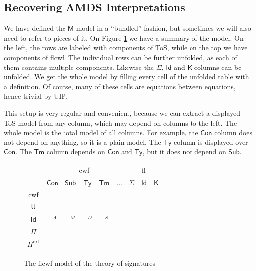 \documentclass[12pt,a4paper,twoside,openany]{book}
\theoremstyle{remark}
\theoremstyle{definition}
\theoremstyle{theorem}
\newcommand{\bs}[1]{\boldsymbol{#1}}
\newcommand{\Con}{\mathsf{Con}}
\newcommand{\Sub}{\mathsf{Sub}}
\newcommand{\Tm}{\mathsf{Tm}}
\newcommand{\Ty}{\mathsf{Ty}}
\newcommand{\U}{\mathsf{U}}
\newcommand{\Id}{\mathsf{Id}}
\newcommand{\blank}{\mathord{\hspace{1pt}\text{--}\hspace{1pt}}}
\newcommand{\Pie}{\Pi^{\mathsf{ext}}}
\newcommand{\K}{\mathsf{K}}
\newcommand{\bM}{\bs{\mathsf{M}}}
\begin{document}
\subsection{Recovering AMDS Interpretations}

We have defined the $\bM$ model in a ``bundled'' fashion, but sometimes we will
also need to refer to pieces of it. On Figure \ref{fig:fqiit-model} we have a
summary of the model. On the left, the rows are labeled with components of ToS,
while on the top we have components of flcwf. The individual rows can be further
unfolded, as each of them contains multiple components. Likewise the $\Sigma$,
$\Id$ and $\K$ columns can be unfolded. We get the whole model by filling every
cell of the unfolded table with a definition. Of course, many of these cells are
equations between equations, hence trivial by UIP.

This setup is very regular and convenient, because we can extract a displayed
ToS model from any column, which may depend on columns to the left. The whole
model is the total model of all columns. For example, the $\Con$ column does not
depend on anything, so it is a plain model. The $\Ty$ column is displayed over
$\Con$. The $\Tm$ column depends on $\Con$ and $\Ty$, but it does not depend on $\Sub$.

\begin{figure}
\begin{center}
\begin{tabular}{ |c|c|c|c|c|c|c|c|c|  }
 \hline
   & \multicolumn{5}{|c|}{cwf} & \multicolumn{3}{c|}{fl}\\
 \cline{2-9}
   & $\Con$ & $\Sub$ & $\Ty$ & $\Tm$ & $...$ & $\Sigma$ & $\Id$ & $\K$ \\
 \hline
   cwf    & \multirow{5}{2em}{$\blank^A$}&\multirow{5}{2em}{$\blank^M$}&\multirow{5}{2em}{$\blank^D$}&\multirow{5}{2em}{$\blank^S$}& & & & \\
   $\U$   &                              &              &                  &    & & & & \\
   $\Id$  &                              &              &                  &    & & & & \\
   $\Pi$  &                              &              &                  &    & & & & \\
   $\Pie$ &                              &              &                  &    & & & & \\
 \hline
\end{tabular}
\end{center}
\caption{The flcwf model of the theory of signatures}
\label{fig:fqiit-model}
\end{figure}
\end{document}
